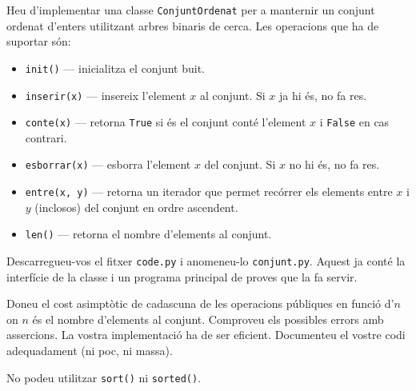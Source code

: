 

\Statement

Heu d'implementar una classe \texttt{ConjuntOrdenat} per a manternir un conjunt ordenat d'enters utilitzant arbres binaris de cerca. Les operacions que ha de suportar són:

\begin{itemize}


    \item \texttt{init()} --- inicialitza el conjunt buit.

    \item \texttt{inserir(x)} --- insereix l'element $x$ al conjunt. Si $x$ ja hi és, no fa res.

    \item \texttt{conte(x)} --- retorna \texttt{True} si és el conjunt conté l'element $x$ i \texttt{False} en cas contrari.

    \item \texttt{esborrar(x)} --- esborra l'element $x$ del conjunt. Si $x$ no hi és, no fa res.

    \item \texttt{entre(x, y)} --- retorna un iterador que permet recórrer els elements entre $x$ i $y$ (inclosos) del conjunt en ordre ascendent.

    \item \texttt{len()} --- retorna el nombre d'elements al conjunt.

\end{itemize}

\medskip

Descarregueu-vos el fitxer \texttt{code.py} i anomeneu-lo \texttt{conjunt.py}. Aquest ja conté la interfície de la classe i un programa principal de proves que la fa servir.

\bigskip

Doneu el cost asimptòtic de cadascuna de les operacions públiques en funció d'$n$ on $n$ és el nombre d'elements al conjunt. Comproveu els possibles errors amb assercions. La vostra implementació ha de ser eficient. Documenteu el vostre codi adequadament (ni poc, ni massa).

\bigskip

No podeu utilitzar \texttt{sort()} ni \texttt{sorted()}.

\SampleOneCol
